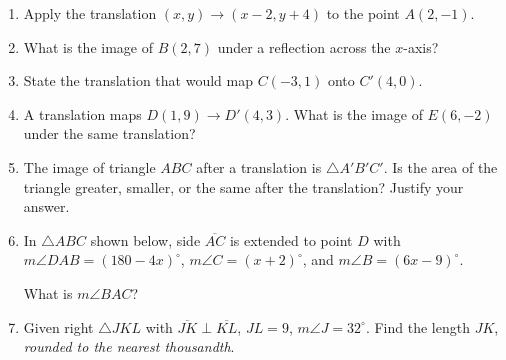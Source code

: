\documentclass[12pt, twoside]{article}
\begin{document}
\begin{enumerate}
\newpage
    \item Apply the translation $(x,y) \rightarrow (x-2,y+4)$ to the point $A(2,-1)$. \vspace{2cm}
    \item What is the image of $B(2,7)$ under a reflection across the $x$-axis? \vspace{2cm}
    \item State the translation that would map $C(-3,1)$ onto $C'(4,0)$. \vspace{3cm}
    \item A translation maps $D(1,9) \rightarrow D'(4,3)$. What is the image of $E(6,-2)$ under the same translation?  \vspace{3cm}

    \item The image of triangle $ABC$ after a translation is $\triangle A'B'C'$. Is the area of the triangle greater, smaller, or the same after the translation? Justify your answer.

\newpage
    \item In  $\triangle ABC$ shown below, side $\overline{AC}$ is extended to point $D$ with $m\angle DAB=(180-4x)^\circ$, $m\angle C=(x+2)^\circ$, and $m\angle B=(6x-9)^\circ$. \\[1cm]
    \begin{center}
      \end{center} \vspace{0.5cm}
      What is $m\angle BAC$?

  \newpage


  \item Given right $\triangle JKL$ with $\overline{JK} \perp \overline{KL}$, $JL=9$, $m\angle J=32^\circ$. Find the length $JK$, \emph{rounded to the nearest thousandth}.
    \begin{center}
    \end{center}


\end{enumerate}
\end{document}
